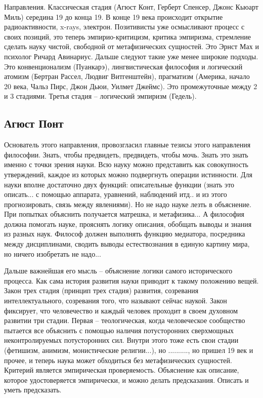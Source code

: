 \documentclass[a4paper, 12pt]{article}
\begin{document}
Направления. Классическая стадия (Агюст Конт, Герберт Спенсер, Джонс 
Кьюарт Миль) середина 19 до конца 19. В конце 19 века происходит 
открытие радиоактивности, x-rays, электрон. Позитивисты уже осмысливают 
процесс с своих позиций, это теперь эмпирио-критицизм, критика 
эмпиризма, стремление сделать науку чистой, свободной от метафизических 
сущностей. Это Эрнст Мах и психолог Ричард Авинариус. Дальше следуют 
такие уже менее широкие подходы. Это конвенционализм (Пуанкарэ), 
лингвистическая философия и логический атомизм (Бертран Рассел, Людвиг 
Витгенштейн), прагматизм (Америка, начало 20 века, Чальз Пирс, Джон 
Дьюи, Уилмет Джеймс). Это промежуточные между 2 и 3 стадиями. Третья 
стадия -- логический эмпиризм (Гедель).

\subsection{Агюст Понт}

Основатель этого направления, провозгласил главные тезисы этого 
направления философии. Знать, чтобы предвидеть, предвидеть, чтобы мочь. 
Знать это знать именно с точки зрения науки. Всю науку можно представить 
как совокупность утверждений, каждое из которых можно подвергнуть 
операции истинности. Для науки вполне достаточно двух функций: 
описательные функции (знать это описать... с помощью аппарата, 
уравнений, наблюдений итд.. и из этого прогнозировать, связь между 
явлениями). Но не надо науке лезть в объяснение. При попытках объяснить 
получается матрешка, и метафизика... А философия должна помогать науке, 
прояснять логику описания, обобщать выводы и знания из разных наук. 
Философ должен выполнять функцию медиатора, посредника между 
дисциплинами, сводить выводы естествознания в единую картину мира, но 
ничего изобретать не надо...

Дальше важнейшая его мысль -- объяснение логики самого исторического 
процесса. Как сама история развития науки приводит к такому положению 
вещей. Закон трех стадия (принцип трех стадия) развития, созревания 
интеллектуального, созревания того, что называют сейчас наукой. Закон 
фиксирует, что человечество и каждый человек проходит в своем духовном 
развитии три стадии. Первая -- теологическая, когда человеческое 
сообщество пытается все объяснить с помощью наличия потусторонних 
сверхмощных неконтролируемых потусторонних сил. Внутри этого тоже есть 
свои стадии (фетишизм, анимизм, монистические религии...), но 
.........., но пришел 19 век и прочее, и теперь наука может обходиться 
без метафизических сущностей. Критерий является эмпирическая 
проверяемость. Объяснение как описание, которое удостоверяется 
эмпирически, и можно делать предсказания. Описать и уметь предсказать.
\end{document}
